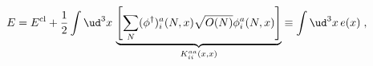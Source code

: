 \begin{equation}
E = E^{\text{cl}} + \frac{1}{2} \int \ud^3 x \, \underbrace{\left[
\sum_{N} (\phi^{\dagger } )_{i}^{a} (N,x) 
\sqrt{O(N)} \phi_{i}^{a} (N,x) \right]}_{K^{a a}_{i i} (x, x)}
\equiv \int \ud^3 x \, e(x) \;,
\end{equation}

